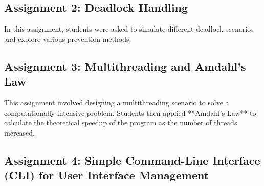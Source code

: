 \documentclass[12pt]{article}
\begin{document}
\subsection{Assignment 2: Deadlock Handling}
In this assignment, students were asked to simulate different deadlock scenarios and explore various prevention methods.

\subsection{Assignment 3: Multithreading and Amdahl's Law}
This assignment involved designing a multithreading scenario to solve a computationally intensive problem. Students then applied **Amdahl's Law** to calculate the theoretical speedup of the program as the number of threads increased.

\subsection{Assignment 4: Simple Command-Line Interface
(CLI) for User Interface Management}
\end{document}
